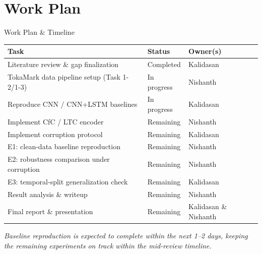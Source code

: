 \documentclass[aspectratio=169]{beamer}
\begin{document}
\section{Work Plan}
\begin{frame}{Work Plan \& Timeline}
  \scriptsize
  \renewcommand{\arraystretch}{1.15}
  \begin{tabular}{P{6.5cm}P{2.6cm}P{2.6cm}}
    \toprule
    \textbf{Task} & \textbf{Status} & \textbf{Owner(s)} \\
    \midrule
    Literature review \& gap finalization & Completed & Kalidasan \\
    TokaMark data pipeline setup (Task 1-2/1-3) & In progress & Nishanth \\
    Reproduce CNN / CNN+LSTM baselines & In progress & Kalidasan \\
    Implement CfC / LTC encoder & Remaining & Nishanth \\
    Implement corruption protocol & Remaining & Kalidasan \\
    E1: clean-data baseline reproduction & Remaining & Nishanth \\
    E2: robustness comparison under corruption & Remaining & Nishanth \\
    E3: temporal-split generalization check & Remaining & Kalidasan \\
    Result analysis \& writeup & Remaining & Nishanth \\
    Final report \& presentation & Remaining & Kalidasan \& Nishanth \\
    \bottomrule
  \end{tabular}
  \vspace{8pt}

  \footnotesize\textit{Baseline reproduction is expected to complete within the next 1--2 days,
  keeping the remaining experiments on track within the mid-review timeline.}
\end{frame}

\end{document}
